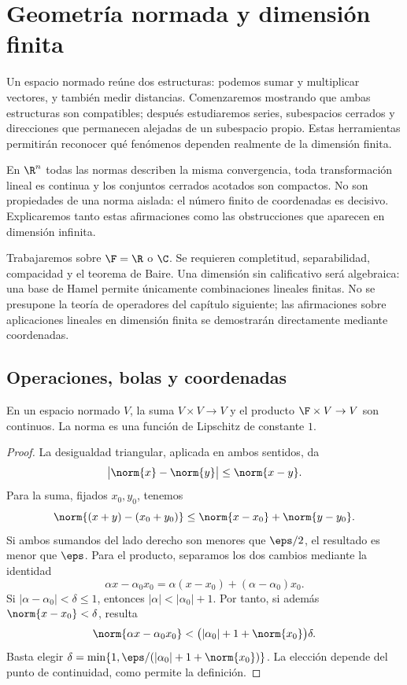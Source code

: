 \chapter{Geometría normada y dimensión finita}\label{cap:nuevo08}\label{chap:19}\label{chap:22}

Un espacio normado reúne dos estructuras: podemos sumar y multiplicar vectores, y también medir distancias. Comenzaremos mostrando que ambas estructuras son compatibles; después estudiaremos series, subespacios cerrados y direcciones que permanecen alejadas de un subespacio propio. Estas herramientas permitirán reconocer qué fenómenos dependen realmente de la dimensión finita.

En $\R^n$ todas las normas describen la misma convergencia, toda transformación lineal es continua y los conjuntos cerrados acotados son compactos. No son propiedades de una norma aislada: el número finito de coordenadas es decisivo. Explicaremos tanto estas afirmaciones como las obstrucciones que aparecen en dimensión infinita.

Trabajaremos sobre $\F=\R$ o $\C$. Se requieren completitud, separabilidad, compacidad y el teorema de Baire. Una dimensión sin calificativo será algebraica: una base de Hamel permite únicamente combinaciones lineales finitas. No se presupone la teoría de operadores del capítulo siguiente; las afirmaciones sobre aplicaciones lineales en dimensión finita se demostrarán directamente mediante coordenadas.

\section{Operaciones, bolas y coordenadas}\label{lectura:19}

\begin{proposicion}\label{ch19:operaciones}
En un espacio normado $V$, la suma $V\times V\to V$ y el producto $\F\times V\to V$ son continuos. La norma es una función de Lipschitz de constante $1$.
\end{proposicion}
\begin{proof}
La desigualdad triangular, aplicada en ambos sentidos, da
\[
 \big|\norm{x}-\norm{y}\big|\leq\norm{x-y}.
\]
Para la suma, fijados $x_0,y_0$, tenemos
\[
 \norm{(x+y)-(x_0+y_0)}\leq\norm{x-x_0}+\norm{y-y_0}.
\]
Si ambos sumandos del lado derecho son menores que $\eps/2$, el resultado es menor que $\eps$. Para el producto, separamos los dos cambios mediante la identidad
\[
 \alpha x-\alpha_0x_0=\alpha(x-x_0)+(\alpha-\alpha_0)x_0.
\]
Si $|\alpha-\alpha_0|<\delta\leq1$, entonces $|\alpha|<|\alpha_0|+1$. Por tanto, si además $\norm{x-x_0}<\delta$, resulta
\[
 \norm{\alpha x-\alpha_0x_0}
 <\bigl(|\alpha_0|+1+\norm{x_0}\bigr)\delta.
\]
Basta elegir $\delta=\min\{1,\eps/(|\alpha_0|+1+\norm{x_0})\}$. La elección depende del punto de continuidad, como permite la definición.
\end{proof}

